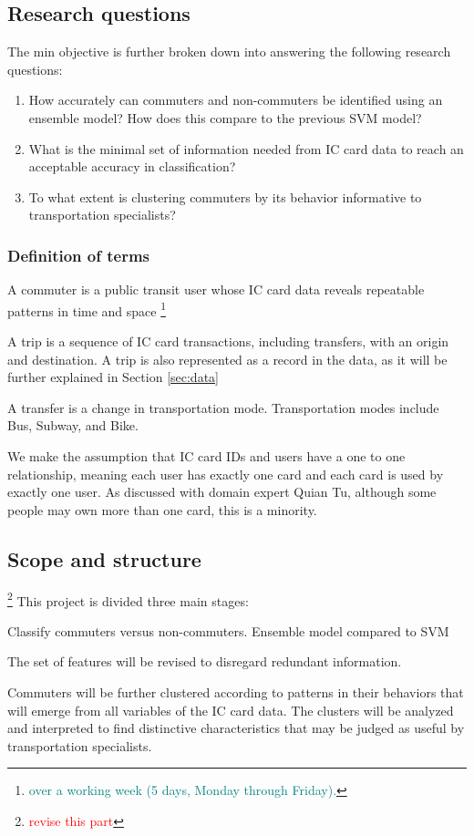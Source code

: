 \documentclass{article}
\newcommand{\selfnote}[1]{\footnote{\textcolor{red}{#1}}}
\newcommand{\domainDoubt}[1]{\footnote{\textcolor{teal}{#1}}}
\begin{document}
\subsection{Research questions}
The min objective is further broken down into answering the following research questions: 

\begin{enumerate}
\item How accurately can commuters and non-commuters be identified using an ensemble model? How does this compare to the previous SVM model?
\item What is the minimal set of information needed from IC card data to reach an acceptable accuracy in classification?
\item To what extent is clustering commuters by its behavior informative to transportation specialists? 
\end{enumerate}

\subsubsection{Definition of terms}
A commuter is a public transit user whose IC card data reveals repeatable patterns in time and space \domainDoubt{over a working week (5 days, Monday through Friday).}

A trip is a sequence of IC card transactions, including transfers, with an origin and destination. A trip is also represented as a record in the data, as it will be further explained in Section \ref{sec:data}

A transfer is a change in transportation mode. Transportation modes include Bus, Subway, and Bike. 

We make the assumption that IC card IDs and users have a one to one relationship, meaning each user has exactly one card and each card is used by exactly one user. As discussed with domain expert Quian Tu, although some people may own more than one card, this is a minority.

\subsection{Scope and structure}
\selfnote{revise this part}
This project is divided three main stages: 

\begin{description}[align=right,labelwidth=2cm]
\item[PART I] Classify commuters versus non-commuters. Ensemble model compared to SVM

\item[PART II] The set of features will be revised to disregard redundant information.

\item[PART III] Commuters will be further clustered according to patterns in their behaviors that will emerge from all variables of the IC card data. The clusters will be analyzed and interpreted to find distinctive characteristics that may be judged as useful by transportation specialists. 
\end{description}
\end{document}

